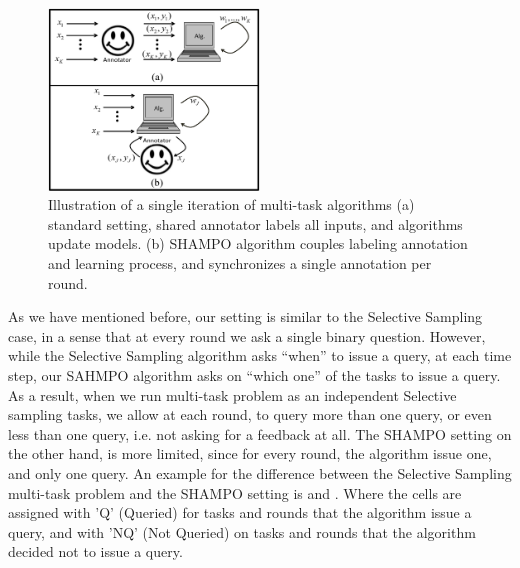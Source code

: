 \begin{figure}
\begin{centering}
\includegraphics[width=0.5\textwidth]{figs/SHAMPO_illustration.eps}
\caption{Illustration of a single iteration of  multi-task algorithms (a) standard setting, shared annotator labels all inputs, and algorithms update models. (b) SHAMPO algorithm couples labeling annotation and learning process, and synchronizes a single annotation per round.}
\label{fig:ilustration}
\end{centering}
\end{figure}

As we have mentioned before, our setting is similar to the Selective Sampling 
case, in a sense that at every round we ask a single binary question. However, 
while the Selective Sampling algorithm asks ``when'' to issue a query, at each time step, our SAHMPO 
algorithm asks on ``which one'' of the tasks to issue a query. As a result, when 
we run multi-task problem as an independent Selective sampling tasks, we allow 
at each round, to query more than one query, or even less than one query, i.e. 
not asking for a feedback at all. The SHAMPO setting on the other hand, is more 
limited, since for every round, the algorithm  issue one, and only one query. An 
example for the difference between the Selective Sampling multi-task problem and 
the SHAMPO setting is  and 
. Where the cells are assigned with 'Q' (Queried) for tasks and 
rounds that the algorithm issue a query, and with 'NQ' (Not Queried) on tasks 
and rounds that the algorithm decided not to issue a query.




